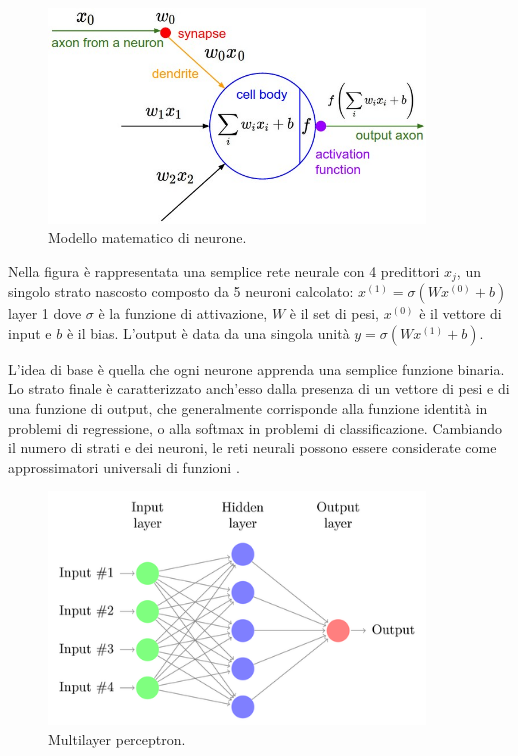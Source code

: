 \begin{figure}[htb]
	\centering
	\includegraphics[width = 100mm]{images/neuron_model.jpeg}
	\caption{Modello matematico di neurone.}
	\label{img:modello_neurone}
\end{figure}

Nella figura è rappresentata una semplice rete neurale con 4 predittori $x_j$, un singolo strato nascosto composto da 5 neuroni calcolato: $x^{(1)} = \sigma(Wx^{(0)} + b)$ layer 1 dove $\sigma$ è la funzione di attivazione, $W$ è il set di pesi, $x^{(0)}$ è il vettore di input e $b$ è il bias. L'output è data da una singola unità $y = \sigma(Wx^{(1)} + b)$.

L'idea di base è quella che ogni neurone apprenda una semplice funzione binaria. Lo strato finale è caratterizzato anch'esso dalla presenza di un vettore di pesi e di una funzione di output, che generalmente corrisponde alla funzione identità in problemi di regressione, o alla softmax in problemi di classificazione. Cambiando il numero di strati e dei neuroni, le reti neurali possono essere considerate come approssimatori universali di funzioni \cite{hornik1989multilayer}.

\begin{figure}[htb]
	\centering
	\includegraphics[width = 100mm]{images/onehidden.png}
	\caption{Multilayer perceptron.}
	\label{img:multilayer_perceptron}
\end{figure}

